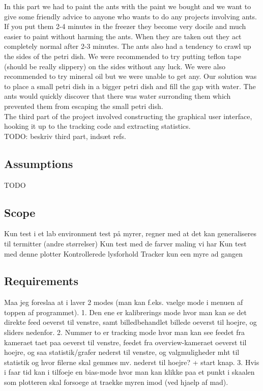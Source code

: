 In this part we had to paint the ants with the paint we bought and we want to give some friendly advice to anyone who wants to do any projects involving ants. If you put them 2-4 minutes in the freezer they become very docile and much easier to paint without harming the ants. When they are taken out they act completely normal after 2-3 minutes. The ants also had a tendency to crawl up the sides of the petri dish. We were recommended to try putting teflon tape (should be really slippery) on the sides without any luck. We were also recommended to try mineral oil but we were unable to get any. Our solution was to place a small petri dish in a bigger petri dish and fill the gap with water. The ants would quickly discover that there was water surronding them which prevented them from escaping the small petri dish. \\

The third part of the project involved constructing the graphical user interface, hooking it up to the tracking code and extracting statistics.  \\

TODO: beskriv third part, indsæt refs.

\subsection{Assumptions}

TODO

\subsection{Scope}

Kun test i et lab environment
test på myrer, regner med at det kan generaliseres til termitter (andre størrelser)
Kun test med de farver maling vi har
Kun test med denne plotter
Kontrollerede lysforhold
Tracker kun een myre ad gangen

\subsection{Requirements}

Maa jeg foreslaa at i laver 2 modes (man kan f.eks. vaelge mode i menuen
af toppen af programmet).
1. Den ene er kalibrerings mode hvor man kan se det direkte feed oeverst
til venstre, samt billedbehandlet billede oeverst til hoejre, og sliders
nedenfor.
2. Nummer to er tracking mode hvor man kan see feedet fra kameraet taet
paa oeverst til venstre, feedet fra overview-kameraet oeverst til hoejre,
og saa statistik/grafer nederst til venstre, og valgmuligheder mht til
statistik og hvor filerne skal gemmes mv. nederst til hoejre? + start
knap.
3. Hvis i faar tid kan i tilfoeje en bias-mode hvor man kan klikke paa et
punkt i skaalen som plotteren skal forsoege at traekke myren imod (ved
hjaelp af mad).

